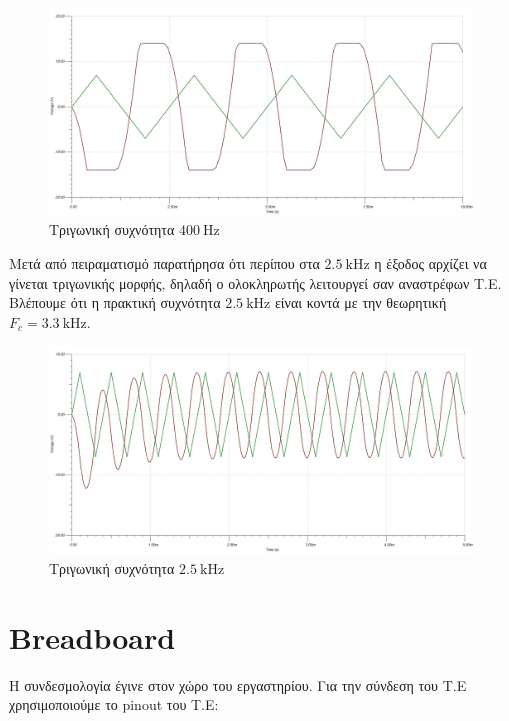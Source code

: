 \documentclass[12pt]{article}
\begin{document}
\begin{figure}[H]
	\centering
	\includegraphics[width=\linewidth]{./res/triang_400hz.jpg}
	\caption{Τριγωνική συχνότητα $\SI{400}{\hertz}$}
\end{figure}

Μετά από πειραματισμό παρατήρησα ότι περίπου στα $\SI{2.5}{\kilo\hertz}$ η
έξοδος αρχίζει να γίνεται τριγωνικής μορφής, δηλαδή ο ολοκληρωτής λειτουργεί
σαν αναστρέφων Τ.Ε. Βλέπουμε ότι η πρακτική συχνότητα $\SI{2.5}{\kilo\hertz}$
είναι κοντά με την θεωρητική $F_c = \SI{3.3}{\kilo\hertz}$.

\begin{figure}[H]
	\centering
	\includegraphics[width=\linewidth]{./res/triang_2.5khz.jpg}
	\caption{Τριγωνική συχνότητα $\SI{2.5}{\kilo\hertz}$}
\end{figure}

\section{Breadboard}

Η συνδεσμολογία έγινε στον χώρο του εργαστηρίου. Για την σύνδεση του Τ.Ε
χρησιμοποιούμε το pinout του Τ.Ε:
\end{document}
